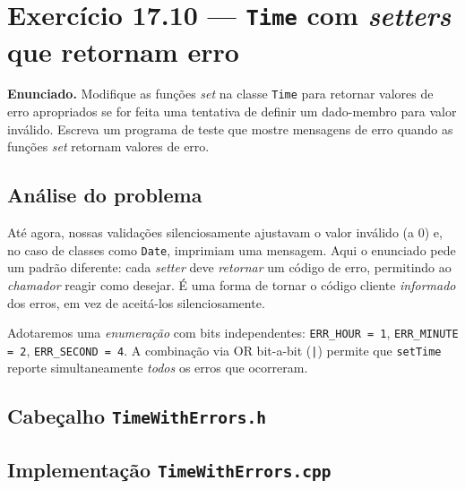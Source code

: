 \documentclass[11pt,a4paper]{article}
\begin{document}
\newpage
\section{Exerc\'icio 17.10 --- \texttt{Time} com \emph{setters} que retornam erro}

\begin{enunciado}
\textbf{Enunciado.} Modifique as fun\c{c}\~oes \emph{set} na classe \texttt{Time} para retornar valores de erro apropriados se for feita uma tentativa de definir um dado-membro para valor inv\'alido. Escreva um programa de teste que mostre mensagens de erro quando as fun\c{c}\~oes \emph{set} retornam valores de erro.
\end{enunciado}

\subsection*{An\'alise do problema}

At\'e agora, nossas valida\c{c}\~oes silenciosamente ajustavam o valor inv\'alido (a 0) e, no caso de classes como \texttt{Date}, imprimiam uma mensagem. Aqui o enunciado pede um padr\~ao diferente: cada \emph{setter} deve \emph{retornar} um c\'odigo de erro, permitindo ao \emph{chamador} reagir como desejar. \'E uma forma de tornar o c\'odigo cliente \emph{informado} dos erros, em vez de aceit\'a-los silenciosamente.

Adotaremos uma \emph{enumera\c{c}\~ao} com bits independentes:
\texttt{ERR\_HOUR = 1}, \texttt{ERR\_MINUTE = 2}, \texttt{ERR\_SECOND = 4}.
A combina\c{c}\~ao via OR bit-a-bit (\texttt{|}) permite que \texttt{setTime} reporte simultaneamente \emph{todos} os erros que ocorreram.

\subsection*{Cabe\c{c}alho \texttt{TimeWithErrors.h}}



\subsection*{Implementa\c{c}\~ao \texttt{TimeWithErrors.cpp}}


\end{document}
